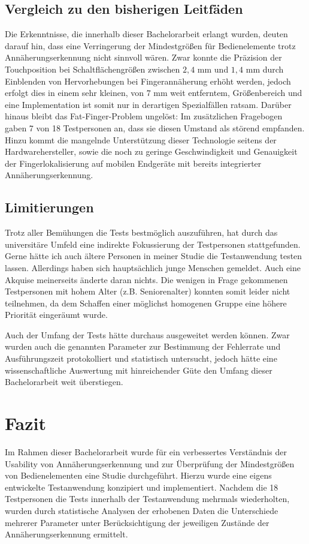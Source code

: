 \documentclass[12pt,numbers=noenddot,parskip,bibliography=totocnumbered,listof=totocnumbered]{scrreprt}
\begin{document}
\section{Vergleich zu den bisherigen Leitfäden}
Die Erkenntnisse, die innerhalb dieser Bachelorarbeit erlangt wurden, deuten darauf hin, dass eine Verringerung der Mindestgrößen für Bedienelemente trotz Annäherungserkennung nicht sinnvoll wären. Zwar konnte die Präzision der Touchposition bei Schaltflächengrößen zwischen $2{,}4$ mm und $1{,}4$ mm durch Einblenden von Hervorhebungen bei Fingerannäherung erhöht werden, jedoch erfolgt dies in einem sehr kleinen, von $7$ mm weit entferntem, Größenbereich und eine Implementation ist somit nur in derartigen Spezialfällen ratsam. Darüber hinaus bleibt das Fat-Finger-Problem ungelöst: Im zusätzlichen Fragebogen gaben 7 von 18 Testpersonen an, dass sie diesen Umstand als störend empfanden.\\
Hinzu kommt die mangelnde Unterstützung dieser Technologie seitens der Hardwarehersteller, sowie die noch zu geringe Geschwindigkeit und Genauigkeit der Fingerlokalisierung auf mobilen Endgeräte mit bereits integrierter Annäherungserkennung.

\section{Limitierungen}
Trotz aller Bemühungen die Tests bestmöglich auszuführen, hat durch das universitäre Umfeld eine indirekte Fokussierung der Testpersonen stattgefunden. Gerne hätte ich auch ältere Personen in meiner Studie die Testanwendung testen lassen. Allerdings haben sich hauptsächlich junge Menschen gemeldet. Auch eine Akquise meinerseits änderte daran nichts. Die wenigen in Frage gekommenen Testpersonen mit hohem Alter (z.B. Seniorenalter) konnten somit leider nicht teilnehmen, da dem Schaffen einer möglichst homogenen Gruppe eine höhere Priorität eingeräumt wurde.

Auch der Umfang der Tests hätte durchaus ausgeweitet werden können. Zwar wurden auch die genannten Parameter zur Bestimmung der Fehlerrate und Ausführungszeit protokolliert und statistisch untersucht, jedoch hätte eine wissenschaftliche Auswertung mit hinreichender Güte den Umfang dieser Bachelorarbeit weit überstiegen.

\chapter{Fazit}
Im Rahmen dieser Bachelorarbeit wurde für ein verbessertes Verständnis der Usability von Annäherungserkennung und zur Überprüfung der Mindestgrößen von Bedienelementen eine Studie durchgeführt. Hierzu wurde eine eigens entwickelte Testanwendung konzipiert und implementiert. Nachdem die 18 Testpersonen die Tests innerhalb der Testanwendung mehrmals wiederholten, wurden durch statistische Analysen der erhobenen Daten die Unterschiede mehrerer Parameter unter Berücksichtigung der jeweiligen Zustände der Annäherungserkennung ermittelt.
\end{document}
